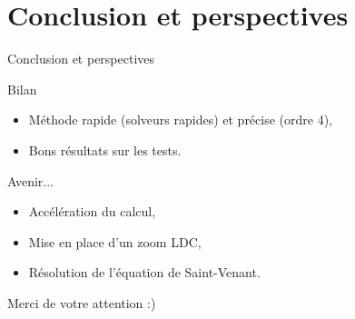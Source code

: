 \documentclass[11pt]{beamer}
\begin{document}
\section{Conclusion et perspectives}
\begin{frame}{Conclusion et perspectives}
\begin{block}{Bilan}
\begin{itemize}
\item Méthode rapide (solveurs rapides) et précise (ordre 4),

\item Bons résultats sur les tests.
\end{itemize}
\end{block}

\pause

\begin{block}{Avenir...}
\begin{itemize}

\item Accélération du calcul,

\item Mise en place d'un zoom LDC,

\item Résolution de l'équation de Saint-Venant.
\end{itemize}
\end{block}
\end{frame}


\begin{frame}
\begin{center}
Merci de votre attention :)
\end{center}
\end{frame}
\end{document}
